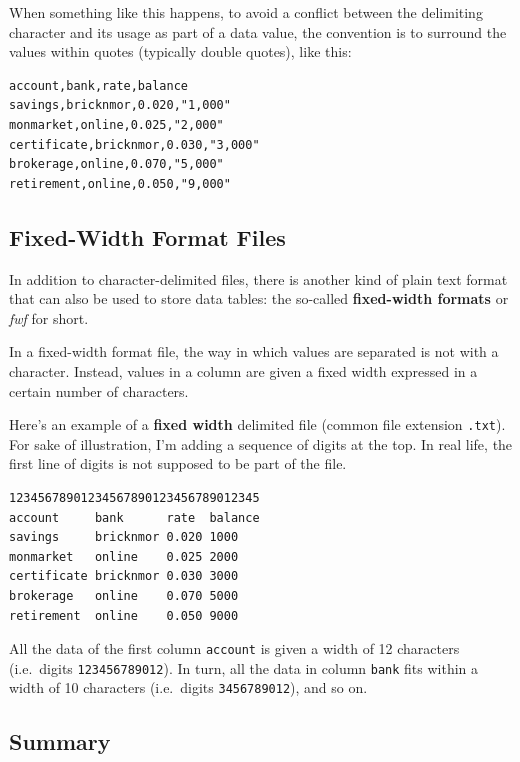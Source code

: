 \documentclass[
]{book}
\begin{document}
When something like this happens, to avoid a conflict between the delimiting
character and its usage as part of a data value, the convention is to surround
the values within quotes (typically double quotes), like this:

\begin{verbatim}
account,bank,rate,balance
savings,bricknmor,0.020,"1,000"
monmarket,online,0.025,"2,000"
certificate,bricknmor,0.030,"3,000"
brokerage,online,0.070,"5,000"
retirement,online,0.050,"9,000"
\end{verbatim}

\hypertarget{fixed-width-format-files}{%
\subsection{Fixed-Width Format Files}\label{fixed-width-format-files}}

In addition to character-delimited files, there is another kind of plain text
format that can also be used to store data tables: the so-called
\textbf{fixed-width formats} or \emph{fwf} for short.

In a fixed-width format file, the way in which values are separated is not with
a character. Instead, values in a column are given a fixed width expressed in a
certain number of characters.

Here's an example of a \textbf{fixed width} delimited file (common file extension
\texttt{.txt}). For sake of illustration, I'm adding a sequence of digits at the top.
In real life, the first line of digits is not supposed to be part of the file.

\begin{verbatim}
12345678901234567890123456789012345
account     bank      rate  balance
savings     bricknmor 0.020 1000
monmarket   online    0.025 2000
certificate bricknmor 0.030 3000
brokerage   online    0.070 5000
retirement  online    0.050 9000
\end{verbatim}

All the data of the first column \texttt{account} is given a width of 12 characters
(i.e.~digits \texttt{123456789012}). In turn, all the data in column \texttt{bank} fits
within a width of 10 characters (i.e.~digits \texttt{3456789012}), and so on.

\hypertarget{summary}{%
\subsection{Summary}\label{summary}}
\end{document}
